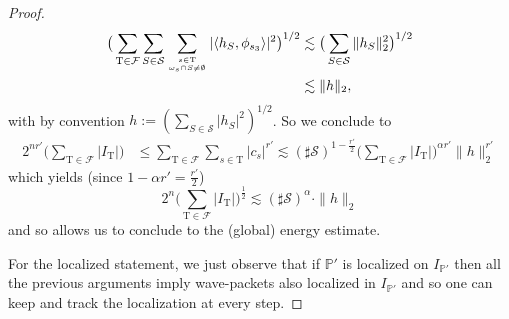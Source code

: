 \documentclass[10pt,a4paper]{amsart}
\newcommand{\FF}{\mathcal{F}}
\newcommand{\PP}{\mathbb{P}}
\newcommand{\TT}{\mathrm{T}}
\begin{document}
\begin{proof}
\begin{align*}
\big(\sum_{\TT\in \FF} \sum_{S\in {\mathcal S}} \sum_{s\in \TT \atop \omega_s \cap S \neq\emptyset} |\langle h_S,\phi_{s_3}\rangle|^{2}\big)^{1/2} & \lesssim \big(\sum_{S\in {\mathcal S}} \|h_S \|_2^2\big)^{1/2} \\
& \lesssim \|h\|_{2},
\end{align*}
with by convention $h:=(\sum_{S\in {\mathcal S}} |h_S|^2)^{1/2}$. So we conclude to
\begin{align*}
2^{nr'} \big(\sum_{\TT\in \FF} |I_{\TT}| \big) & \leq
\sum_{\TT\in \FF} \sum_{s\in \TT} |c_s|^{r'}  \lesssim (\sharp {\mathcal S})^{1-\frac{r'}{2}}
\big(\sum_{\TT\in \FF} |I_{\TT}|\big)^{\alpha r'} \|h\|_2^{r'} 
\end{align*}
which yields (since $1-\alpha r'=\frac{r'}{2}$)
$$ 2^{n} \big(\sum_{\TT\in \FF} |I_{\TT}| \big)^{\frac{1}{2}} \lesssim (\sharp {\mathcal S})^{\alpha} \cdot \|h\|_2$$
and so allows us to conclude to the (global) energy estimate.

For the localized statement, we just observe that if $\PP'$ is localized on $I_{\PP'}$ then all the previous arguments imply wave-packets also localized in $I_{\PP'}$ and so one can keep and track the localization at every step.
\end{proof}
\end{document}
